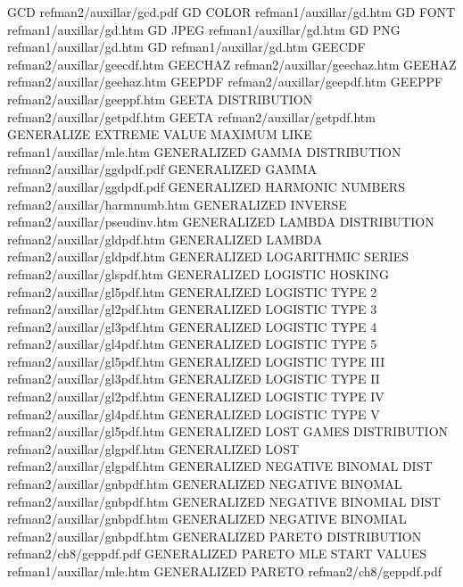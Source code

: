 GCD                                     refman2/auxillar/gcd.pdf
GD COLOR                                refman1/auxillar/gd.htm
GD FONT                                 refman1/auxillar/gd.htm
GD JPEG                                 refman1/auxillar/gd.htm
GD PNG                                  refman1/auxillar/gd.htm
GD                                      refman1/auxillar/gd.htm
GEECDF                                  refman2/auxillar/geecdf.htm
GEECHAZ                                 refman2/auxillar/geechaz.htm
GEEHAZ                                  refman2/auxillar/geehaz.htm
GEEPDF                                  refman2/auxillar/geepdf.htm
GEEPPF                                  refman2/auxillar/geeppf.htm
GEETA DISTRIBUTION                      refman2/auxillar/getpdf.htm
GEETA                                   refman2/auxillar/getpdf.htm
GENERALIZE EXTREME VALUE MAXIMUM LIKE   refman1/auxillar/mle.htm
GENERALIZED GAMMA DISTRIBUTION          refman2/auxillar/ggdpdf.pdf
GENERALIZED GAMMA                       refman2/auxillar/ggdpdf.pdf
GENERALIZED HARMONIC NUMBERS            refman2/auxillar/harmnumb.htm
GENERALIZED INVERSE                     refman2/auxillar/pseudinv.htm
GENERALIZED LAMBDA DISTRIBUTION         refman2/auxillar/gldpdf.htm
GENERALIZED LAMBDA                      refman2/auxillar/gldpdf.htm
GENERALIZED LOGARITHMIC SERIES          refman2/auxillar/glspdf.htm
GENERALIZED LOGISTIC HOSKING            refman2/auxillar/gl5pdf.htm
GENERALIZED LOGISTIC TYPE 2             refman2/auxillar/gl2pdf.htm
GENERALIZED LOGISTIC TYPE 3             refman2/auxillar/gl3pdf.htm
GENERALIZED LOGISTIC TYPE 4             refman2/auxillar/gl4pdf.htm
GENERALIZED LOGISTIC TYPE 5             refman2/auxillar/gl5pdf.htm
GENERALIZED LOGISTIC TYPE III           refman2/auxillar/gl3pdf.htm
GENERALIZED LOGISTIC TYPE II            refman2/auxillar/gl2pdf.htm
GENERALIZED LOGISTIC TYPE IV            refman2/auxillar/gl4pdf.htm
GENERALIZED LOGISTIC TYPE V             refman2/auxillar/gl5pdf.htm
GENERALIZED LOST GAMES DISTRIBUTION     refman2/auxillar/glgpdf.htm
GENERALIZED LOST                        refman2/auxillar/glgpdf.htm
GENERALIZED NEGATIVE BINOMAL DIST       refman2/auxillar/gnbpdf.htm
GENERALIZED NEGATIVE BINOMAL            refman2/auxillar/gnbpdf.htm
GENERALIZED NEGATIVE BINOMIAL DIST      refman2/auxillar/gnbpdf.htm
GENERALIZED NEGATIVE BINOMIAL           refman2/auxillar/gnbpdf.htm
GENERALIZED PARETO DISTRIBUTION         refman2/ch8/geppdf.pdf
GENERALIZED PARETO MLE START VALUES     refman1/auxillar/mle.htm
GENERALIZED PARETO                      refman2/ch8/geppdf.pdf
